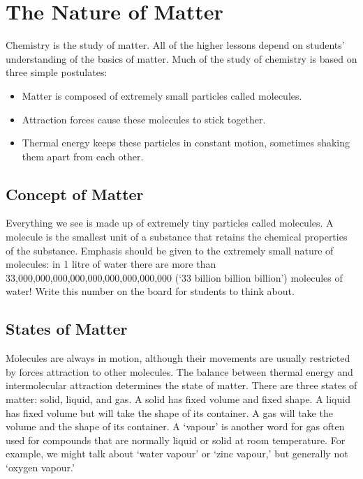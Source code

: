 \chapter{The Nature of Matter}

Chemistry is the study of matter. All of the higher lessons depend on students' understanding of the basics of matter. Much of the study of chemistry is based on three simple postulates:
\begin{itemize}
\item{Matter is composed of extremely small particles called molecules.}
\item{Attraction forces cause these molecules to stick together.}
\item{Thermal energy keeps these particles in constant motion, sometimes shaking them apart from each other.}
\end{itemize}


\section{Concept of Matter}

Everything we see is made up of extremely tiny particles called molecules. A molecule is the smallest unit of a substance that retains the chemical properties of the substance. Emphasis should be given to the extremely small nature of molecules: in 1 litre of water there are more than 33,000,000,000,000,000,000,000,000,000 (`33 billion billion billion') molecules of water! Write this number on the board for students to think about.


\section{States of Matter}

Molecules are always in motion, although their movements are usually restricted by forces attraction to other molecules. The balance between thermal energy and intermolecular attraction determines the state of matter.
There are three states of matter: solid, liquid, and gas. A solid has fixed volume and fixed shape. A liquid has fixed volume but will take the shape of its container. A gas will take the volume and the shape of its container. A `vapour' is another word for gas often used for compounds that are normally liquid or solid at room temperature. For example, we might talk about `water vapour' or `zinc vapour,' but generally not `oxygen vapour.'


